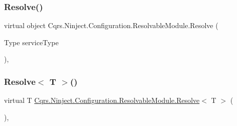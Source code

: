 \subsubsection{\texorpdfstring{Resolve()}{Resolve()}}
{\footnotesize\ttfamily virtual object Cqrs.\+Ninject.\+Configuration.\+Resolvable\+Module.\+Resolve (\begin{DoxyParamCaption}\item[{Type}]{service\+Type }\end{DoxyParamCaption})\hspace{0.3cm}{\ttfamily [protected]}, {\ttfamily [virtual]}}

\mbox{\label{classCqrs_1_1Ninject_1_1Configuration_1_1ResolvableModule_a41a1826cee70c7627e6ec1ef0053f1ea_a41a1826cee70c7627e6ec1ef0053f1ea}} 
\subsubsection{\texorpdfstring{Resolve$<$ T $>$()}{Resolve< T >()}}
{\footnotesize\ttfamily virtual T \hyperlink{classCqrs_1_1Ninject_1_1Configuration_1_1ResolvableModule_ad0851fd40b9e9ef25f345280b8cae1f0_ad0851fd40b9e9ef25f345280b8cae1f0}{Cqrs.\+Ninject.\+Configuration.\+Resolvable\+Module.\+Resolve}$<$ T $>$ (\begin{DoxyParamCaption}{ }\end{DoxyParamCaption})\hspace{0.3cm}{\ttfamily [protected]}, {\ttfamily [virtual]}}

